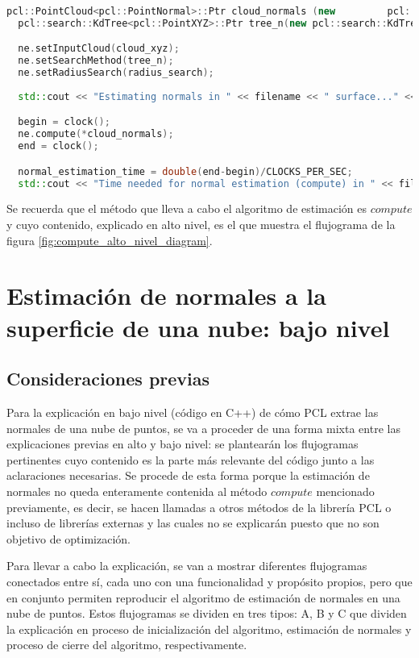 \begin{lstlisting}[language=C++,breaklines]
  pcl::PointCloud<pcl::PointNormal>::Ptr cloud_normals (new 		pcl::PointCloud<pcl::PointNormal>);
  pcl::search::KdTree<pcl::PointXYZ>::Ptr tree_n(new pcl::search::KdTree<pcl::PointXYZ>());

  ne.setInputCloud(cloud_xyz);
  ne.setSearchMethod(tree_n);
  ne.setRadiusSearch(radius_search);
 
  std::cout << "Estimating normals in " << filename << " surface..." <<std::endl;

  begin = clock();
  ne.compute(*cloud_normals);
  end = clock();

  normal_estimation_time = double(end-begin)/CLOCKS_PER_SEC;
  std::cout << "Time needed for normal estimation (compute) in " << filename << ": " << normal_estimation_time << " seconds" << std::endl << std::endl;
\end{lstlisting}

Se recuerda que el método que lleva a cabo el algoritmo de estimación es $compute$ y cuyo contenido, explicado en alto nivel, es el que muestra el flujograma de la figura \ref{fig:compute_alto_nivel_diagram}.


\section{Estimación de normales a la superficie de una nube: bajo nivel}
\subsection{Consideraciones previas}
Para la explicación en bajo nivel (código en C++) de cómo PCL extrae las normales de una nube de puntos, se va a proceder de una forma mixta entre las explicaciones previas en alto y bajo nivel: se plantearán los flujogramas pertinentes cuyo contenido es la parte más relevante del código junto a las aclaraciones necesarias. Se procede de esta forma porque la estimación de normales no queda enteramente contenida al método $compute$ mencionado previamente, es decir, se hacen llamadas a otros métodos de la librería PCL o incluso de librerías externas y las cuales no se explicarán puesto que no son objetivo de optimización.

Para llevar a cabo la explicación, se van a mostrar diferentes flujogramas conectados entre sí, cada uno con una funcionalidad y propósito propios, pero que en conjunto permiten reproducir el algoritmo de estimación de normales en una nube de puntos. Estos flujogramas se dividen en tres tipos: A, B y C que dividen la explicación en proceso de inicialización del algoritmo, estimación de normales y proceso de cierre del algoritmo, respectivamente.

